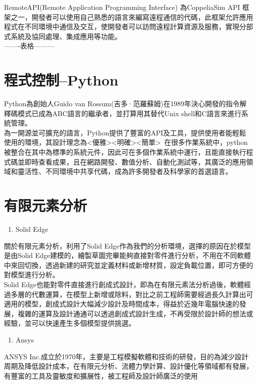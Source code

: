 RemoteAPI(Remote Application Programming Interface) 為CoppeliaSim API 框架之一，開發者可以使用自己熟悉的語言來編寫遠程通信的代碼，此框架允許應用程式在不同環境中通信及交互，使開發者可以訪問遠程計算資源及服務，實現分部式系統及協同處理、集成應用等功能。\\

-------表格---------
\newpage

\section{程式控制--Python}
Python為創始人Guido van Rossum(吉多·范羅蘇姆)在1989年決心開發的指令解釋碼模式已成為ABC語言的繼承者，並打算用其替代Unix shell和C語言來進行系統管理。\\

為一開源並可擴充的語言，Python提供了豐富的API及工具，提供使用者能輕鬆使用的環境，其設計理念為<優雅><明確><簡單>\
在很多作業系統中，python被整合在其中為標準的系統元件，因此可在多個作業系統中運行，且能直接執行程式碼並即時查看成果，且在網路開發、數值分析、自動化測試等，其廣泛的應用領域和靈活性、不同環境中共享代碼，成為許多開發者及科學家的首選語言。\\

\section{有限元素分析}
\begin{enumerate}
\item Solid Edge
\end{enumerate}
關於有限元素分析，利用了Solid Edge作為我們的分析環境，選擇的原因在於模型是由Solid Edge建模的，繪製草圖完畢能夠直接對零件進行分析，不用在不同軟體中來回切換，透過新建的研究並定義材料或新增材質，設定負載位置，即可方便的對模型進行分析。\\

Solid Edge也能對零件直接進行創成式設計，即為在有限元素法分析過後，軟體經過多層的代數運算，在模型上新增或除料，對比之前工程師需要經過長久計算出可適用的模型，創成式設計大幅減少設計及時間成本，得益於近幾年電腦快速的發展，複雜的運算及設計通通可以透過創成式設計生成，不再受限於設計師的想法或經驗，並可以快速產生多個模型提供挑選。\\

\begin{enumerate}
\item Ansys
\end{enumerate}
ANSYS Inc.成立於1970年，主要是工程模擬軟體和技術的研發，目的為減少設計周期及降低設計成本，在有限元分析、流體力學計算、設計優化等領域都有發展，有豐富的工具及靈敏度和擴展性，被工程師及設計師廣泛的使用\\

\newpage
